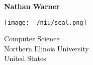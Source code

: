 \documentclass{report}
\title{\Huge{}}
\author{\huge{Nathan Warner}}
\date{\huge{}}
\begin{document}
        \begin{titlepage}
       \begin{center}
           \vspace*{1cm}
    
           \textbf{}
    
           \vspace{0.5cm}
            
                
           \vspace{1.5cm}
    
           \textbf{Nathan Warner}
    
           \vfill
                
                
           \vspace{0.8cm}
         
           \texttt{[image: ~/niu/seal.png]}
                
           Computer Science \\
           Northern Illinois University\\
           United States\\
           
                
       \end{center}
    \end{titlepage}
    \tableofcontents
    \pagebreak 
    \bigbreak \noindent 
\end{document}

